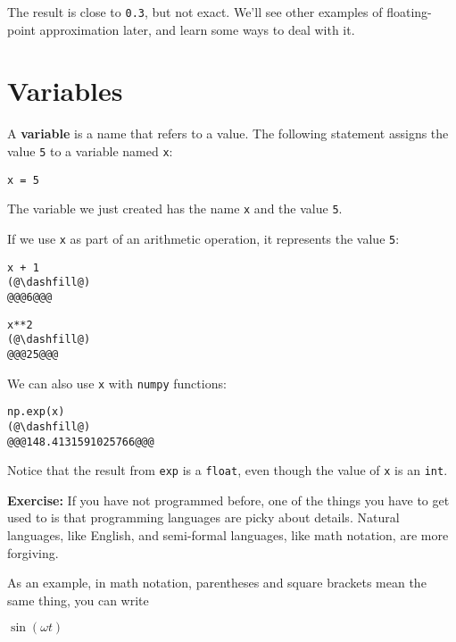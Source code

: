 The result is close to \passthrough{\lstinline!0.3!}, but not exact.
We'll see other examples of floating-point approximation later, and
learn some ways to deal with it.

\hypertarget{variables}{%
\section{Variables}\label{variables}}

A \textbf{variable} is a name that refers to a value. The following
statement assigns the value \passthrough{\lstinline!5!} to a variable
named \passthrough{\lstinline!x!}:

\begin{lstlisting}[]
x = 5
\end{lstlisting}

The variable we just created has the name \passthrough{\lstinline!x!}
and the value \passthrough{\lstinline!5!}.

If we use \passthrough{\lstinline!x!} as part of an arithmetic
operation, it represents the value \passthrough{\lstinline!5!}:

\begin{lstlisting}[]
x + 1
(@\dashfill@)
@@@6@@@
\end{lstlisting}

\begin{lstlisting}[]
x**2
(@\dashfill@)
@@@25@@@
\end{lstlisting}

We can also use \passthrough{\lstinline!x!} with
\passthrough{\lstinline!numpy!} functions:

\begin{lstlisting}[]
np.exp(x)
(@\dashfill@)
@@@148.4131591025766@@@
\end{lstlisting}

Notice that the result from \passthrough{\lstinline!exp!} is a
\passthrough{\lstinline!float!}, even though the value of
\passthrough{\lstinline!x!} is an \passthrough{\lstinline!int!}.

\textbf{Exercise:} If you have not programmed before, one of the things
you have to get used to is that programming languages are picky about
details. Natural languages, like English, and semi-formal languages,
like math notation, are more forgiving.

As an example, in math notation, parentheses and square brackets mean
the same thing, you can write

\(\sin (\omega t)\)

